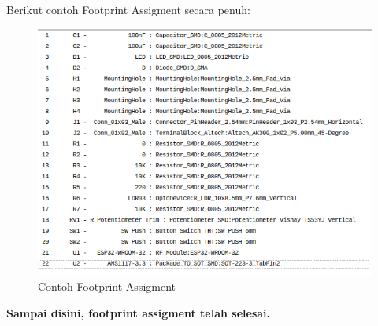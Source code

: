 \documentclass[12pt]{book}
\begin{document}
	Berikut contoh Footprint Assigment secara penuh:

	\begin{figure}[!ht]
		\centering
		\includegraphics[width=\textwidth]{images/fpa/fpa_full}
		\caption{Contoh Footprint Assigment}
	\end{figure}

	\begin{center}
		\textbf{Sampai disini, footprint assigment telah selesai.}
	\end{center}
\end{document}
